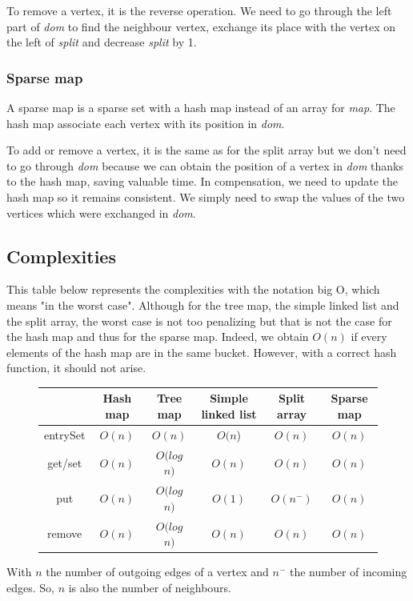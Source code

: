 To remove a vertex, it is the reverse operation. We need to go through the left part of \textit{dom} to find the neighbour vertex, exchange its place with the vertex on the left of \textit{split} and decrease \textit{split} by 1.
\subsubsection{Sparse map}
A sparse map is a sparse set with a hash map instead of an array for \textit{map}. The hash map associate each vertex with its position in \textit{dom}.

To add or remove a vertex, it is the same as for the split array but we don't need to go through \textit{dom} because we can obtain the position of a vertex in \textit{dom} thanks to the hash map, saving valuable time. In compensation, we need to update the hash map so it remains consistent. We simply need to swap the values of the two vertices which were exchanged in \textit{dom}.
\newpage
\subsection{Complexities}

This table below represents the complexities with the notation big O, which means "in the worst case". Although for the tree map, the simple linked list and the split array, the worst case is not too penalizing but that is not the case for the hash map and thus for the sparse map. Indeed, we obtain $O(n)$ if every elements of the hash map are in the same bucket. However, with a correct hash function, it should not arise. \newline
\begin{figure}[H]
\centering
\begin{tabular}{|c|c|c|c|c|c|}
	\hline
     & \textbf{Hash map} & \textbf{Tree map} & \textbf{Simple linked list} & \textbf{Split array} & \textbf{Sparse map}\\
     \hline	
   entrySet & $O(n)$ & $O(n)$ & $O(n$) & $O(n)$ & $O(n)$ \\
   get/set & $O(n)$ & $O(log$ $n)$ & $O(n)$ & $O(n)$ & $O(n)$ \\
   put & $O(n)$ & $O(log$ $n)$ & $O(1)$ & $O(n^-)$ & $O(n)$ \\
   remove & $O(n)$ & $O(log$ $n)$ & $O(n)$ & $O(n)$ & $O(n)$ \\
   \hline
\end{tabular} 
\end{figure}

With $n$ the number of outgoing edges of a vertex and $n^-$ the number of incoming edges. So, $n$ is also the number of neighbours.